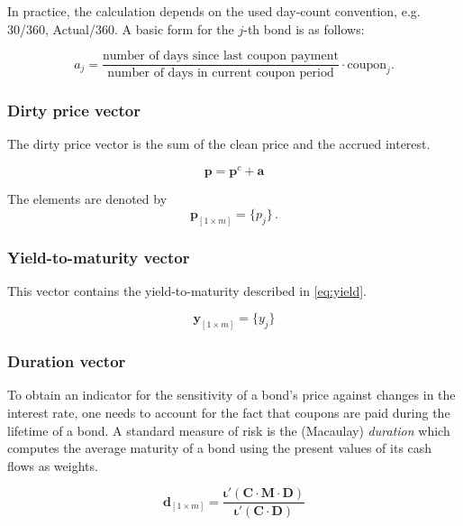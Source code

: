 In practice, the calculation depends on the used day-count convention, e.g. 30/360, Actual/360. A basic form for the $j$-th bond is as follows:

\begin{equation*}
    a_j= \frac{\mbox{number of days since last coupon payment}}{\mbox{number of days in current coupon period}}\cdot \mbox{coupon}_j.
\end{equation*}
 	

\subsubsection*{Dirty price vector}

The dirty price vector is the sum of the clean price and the accrued interest.

\begin{displaymath}
\bm{p}=\bm{p}^c+\bm{a}
\end{displaymath}

The elements are denoted by 
\begin{equation*}\label{pd}
    \bm{p}_{\left[1\times m\right]}= \{p_j\}\,.
\end{equation*}


\subsubsection*{Yield-to-maturity vector}

This vector contains the yield-to-maturity described in \eqref{eq:yield}.

\begin{equation*}\label{pd}
    \bm{y}_{\left[1\times m\right]}= \{y_j\}
\end{equation*}



\subsubsection*{Duration vector}

To obtain an indicator for the sensitivity of a bond's price against changes in the interest rate, one needs to account for the fact that coupons are paid during the lifetime of a bond. A standard measure of risk is the (Macaulay) \emph{duration} which computes the average maturity of a bond using the present values of its cash flows as weights.



\begin{equation*}
  \label{eq:macaulayduration}
  \bm{d}_{\left[1\times m\right]} = \frac{\bm{\iota}'(\bm{C}\cdot\bm{M}\cdot\bm{D})}{\bm{\iota}'(\bm{C}\cdot\bm{D})}
\end{equation*}

